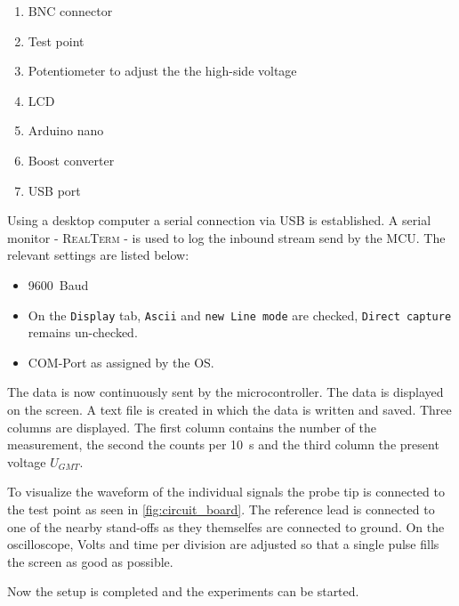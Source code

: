 %
\begin{enumerate}
	\item BNC connector
	\item Test point
	\item Potentiometer to adjust the the high-side voltage
	\item LCD
	\item Arduino nano
	\item Boost converter
	\item USB port
\end{enumerate}\par\medskip
%
Using a desktop computer a serial connection via USB is established. A serial monitor - \textsc{RealTerm} - is used to
log the inbound stream send by the MCU. The relevant settings are listed below:
\begin{itemize}
	\item \SI[]{9600}[]{Baud}
	\item On the \texttt{Display} tab, \texttt{Ascii} and \texttt{new Line mode} are checked, \texttt{Direct capture} remains un-checked.
	\item COM-Port as assigned by the OS.
\end{itemize}
%
The data is now continuously sent by the microcontroller. The data is displayed on the screen. A text file is created in
which the data is written and saved. Three columns are displayed. The first column contains the number of the measurement,
the second the counts per \SI[]{10}[]{s} and the third column the present voltage \(U_{GMT}\).\par
To visualize the waveform of the individual signals the probe tip is connected to the test point as seen in \cref{fig:circuit_board}.
The reference lead is connected to one of the nearby stand-offs as they themselfes are connected to ground. On the oscilloscope,
Volts and time per division are adjusted so that a single pulse fills the screen as good as possible.\par
Now the setup is completed and the experiments can be started.